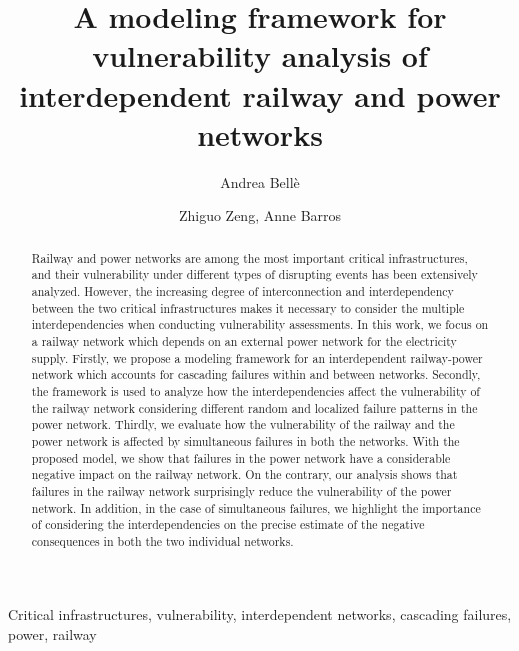 \documentclass[review]{elsarticle}
\begin{document}
\begin{frontmatter}

\title{A modeling framework for vulnerability analysis of interdependent railway and power networks}

\author{Andrea Bellè}
\author{Zhiguo Zeng, Anne Barros}
\address{Chair on Risk and Resilience of Complex Systems, Laboratoire Génie Industriel, CentraleSupélec, Université Paris-Saclay}






\begin{abstract}
Railway and power networks are among the most important critical infrastructures, and their vulnerability under different types of disrupting events has been extensively analyzed. However, the increasing degree of interconnection and interdependency between the two critical infrastructures makes it necessary to consider the multiple interdependencies when conducting vulnerability assessments. In this work, we focus on a railway network which depends on an external power network for the electricity supply. Firstly, we propose a modeling framework for an interdependent railway-power network which accounts for cascading failures within and between networks. Secondly, the framework is used to analyze how the interdependencies affect the vulnerability of the railway network considering different random and localized failure patterns in the power network. Thirdly, we evaluate how the vulnerability of the railway and the power network is affected by simultaneous failures in both the networks. With the proposed model, we show that failures in the power network have a considerable negative impact on the railway network. On the contrary, our analysis shows that failures in the railway network surprisingly reduce the vulnerability of the power network. In addition, in the case of simultaneous failures, we highlight the importance of considering the interdependencies on the precise estimate of the negative consequences in both the two individual networks.
\end{abstract}

\begin{keyword}
Critical infrastructures, vulnerability, interdependent networks, cascading failures, power, railway
\end{keyword}

\end{frontmatter}
\end{document}

